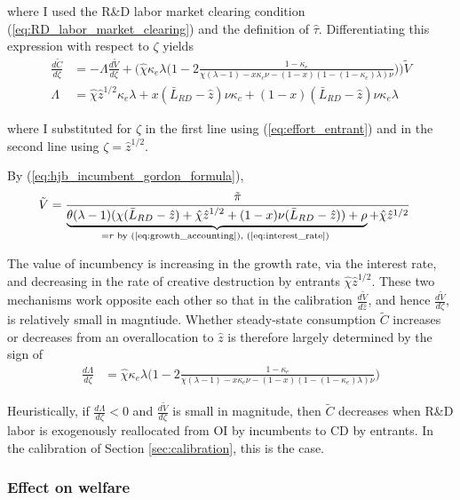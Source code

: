 \documentclass[11pt,english]{article}
\begin{document}
where I used the R\&D labor market clearing condition (\ref{eq:RD_labor_market_clearing}) and the definition of $\hat{\tau}$. Differentiating this expression with respect to $\zeta$ yields
\begin{align}
	\frac{d\tilde{C}}{d\zeta} &= - \Lambda \frac{d\tilde{V}}{d\zeta}  + \Big(  \hat{\chi} \kappa_e \lambda \big( 1 - 2\frac{1-\kappa_e}{\chi(\lambda -1) - x \kappa_c \nu - (1-x) (1 - (1-\kappa_e) \lambda) \nu }\big) \Big) \tilde{V} \\
	\Lambda &= \hat{\chi} \hat{z}^{1/2} \kappa_e \lambda  + x (\bar{L}_{RD} - \hat{z}) \nu \kappa_c + (1-x)  (\bar{L}_{RD} - \hat{z}) \nu \kappa_e \lambda 
\end{align}

where I substituted for $\zeta$ in the first line using (\ref{eq:effort_entrant}) and in the second line using $\zeta = \hat{z}^{1/2}$. 

By (\ref{eq:hjb_incumbent_gordon_formula}),
\begin{align}
	\tilde{V} &= \frac{\tilde{\pi}}{\underbrace{\theta (\lambda -1) (\chi (\bar{L}_{RD} - \hat{z}) + \hat{\chi} \hat{z}^{1/2} + (1-x) \nu (\bar{L}_{RD} - \hat{z})) + \rho}_{\mathclap{= r\text{ by (\ref{eq:growth_accounting}), (\ref{eq:interest_rate}) }} }  + \hat{\chi} \hat{z}^{1/2}} 
\end{align}

The value of incumbency is increasing in the growth rate, via the interest rate, and decreasing in the rate of creative destruction by entrants $\hat{\chi} \hat{z}^{1/2}$. These two mechanisms work opposite each other so that in the calibration $\frac{d\tilde{V}}{d\hat{z}}$, and hence $\frac{d\tilde{V}}{d\zeta}$, is relatively small in magntiude. Whether steady-state consumption $\tilde{C}$ increases or decreases from an overallocation to $\hat{z}$ is therefore largely determined by the sign of 
\begin{align}
	\frac{d\Lambda}{d\zeta} &= \hat{\chi} \kappa_e \lambda \Big( 1 - 2\frac{1-\kappa_e}{\chi(\lambda -1) - x \kappa_c \nu - (1-x) (1 - (1-\kappa_e) \lambda) \nu }\Big)
\end{align} 

Heuristically, if $\frac{d\Lambda}{d\zeta} < 0$ and $\frac{d\tilde{V}}{d\zeta}$ is small in magnitude, then $\tilde{C}$ decreases when R\&D labor is exogenously reallocated from OI by incumbents to CD by entrants. In the calibration of Section \ref{sec:calibration}, this is the case.

\subsubsection{Effect on welfare}
\end{document}
